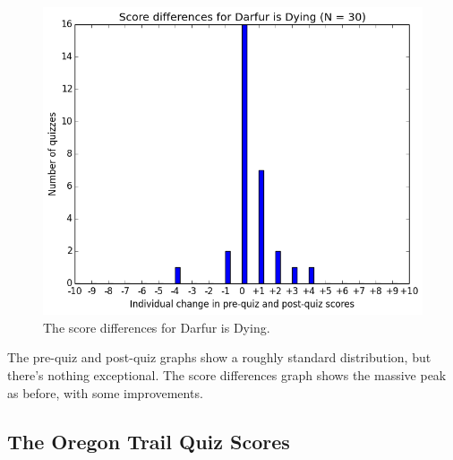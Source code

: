 			\begin{figure}[] 
			\centering 
			\includegraphics[width=\textwidth]{darfur_results.png} 
			\caption{The score differences for Darfur is Dying.}
			\end{figure}

			The pre-quiz and post-quiz graphs show a roughly standard distribution, but there's nothing exceptional. The score differences graph shows the massive peak as before, with some improvements.

			\clearpage

		\subsection{The Oregon Trail Quiz Scores}		


